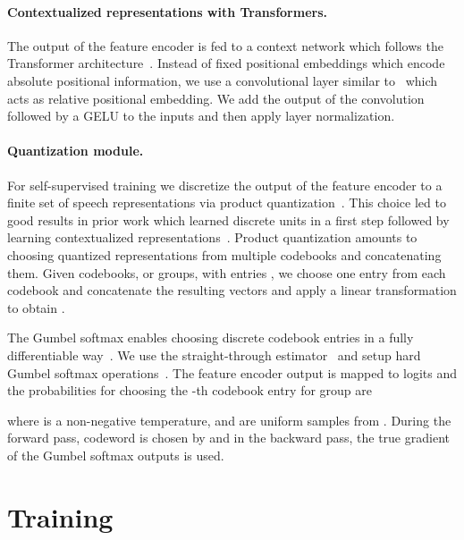 \documentclass{article}
\begin{document}
\paragraph{Contextualized representations with Transformers.}
The output of the feature encoder is fed to a context network which follows the Transformer architecture~\cite{vaswani2017transformer,devlin2018bert,liu2019roberta}. 
Instead of fixed positional embeddings which encode absolute positional information, we use a convolutional layer similar to~\cite{mohamed2019libri,baevski2019effectiveness,wu2019pay} which acts as relative positional embedding.
We add the output of the convolution followed by a GELU to the inputs and then apply layer normalization.


\paragraph{Quantization module.} 
For self-supervised training we discretize the output of the feature encoder  to a finite set of speech representations via product quantization~\citep{jegou2011ieee}.
This choice led to good results in prior work which learned discrete units in a first step followed by learning contextualized representations~\cite{baevski2019vqwav2vec}.
Product quantization amounts to choosing quantized representations from multiple codebooks and concatenating them. 
Given  codebooks, or groups, with  entries , we choose one entry from each codebook and concatenate the resulting vectors  and apply a linear transformation  to obtain .

The Gumbel softmax enables choosing discrete codebook entries in a fully differentiable way~\citep{gumbel1954statistical,jang2016gumbel,maddison2014sampling}. 
We use the straight-through estimator~\citep{jiang2019improving} and setup  hard Gumbel softmax operations~\citep{jang2016gumbel}. 
The feature encoder output  is mapped to  logits and the probabilities for choosing the -th codebook entry for group  are

where  is a non-negative temperature,  and  are uniform samples from .
During the forward pass, codeword  is chosen by  and in the backward pass, the true gradient of the Gumbel softmax outputs is used.



\section{Training}
\label{sec:training}
\end{document}
